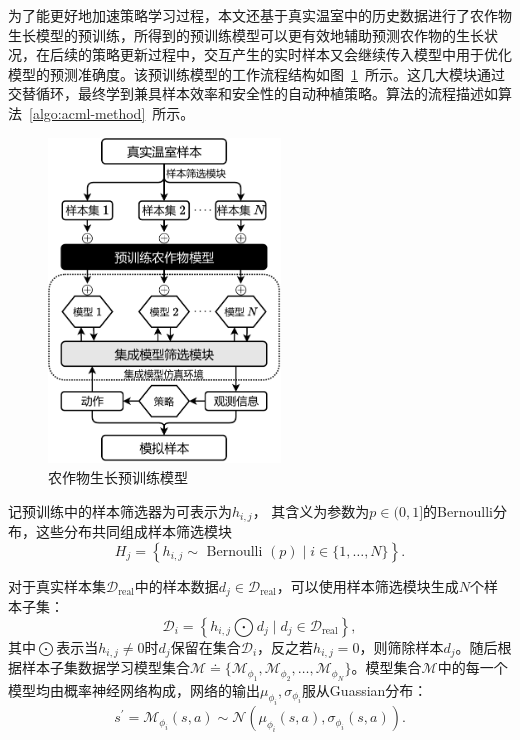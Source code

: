 为了能更好地加速策略学习过程，本文还基于真实温室中的历史数据进行了农作物生长模型的预训练，所得到的预训练模型可以更有效地辅助预测农作物的生长状况，在后续的策略更新过程中，交互产生的实时样本又会继续传入模型中用于优化模型的预测准确度。该预训练模型的工作流程结构如图~\ref{fig:pre-train-model}~所示。这几大模块通过交替循环，最终学到兼具样本效率和安全性的自动种植策略。算法的流程描述如算法~\ref{algo:acml-method}~所示。

\begin{figure}[ht]
\centering
\includegraphics[width=0.55\textwidth]{figures/pre-train-model.pdf}
\caption{农作物生长预训练模型}
\label{fig:pre-train-model}
\end{figure}

记预训练中的样本筛选器为可表示为$h_{i,j}$， 其含义为参数为$p\in(0, 1]$的Bernoulli分布，这些分布共同组成样本筛选模块
\begin{equation}
    H_{j}=\left\{h_{i,j} \sim \text { Bernoulli }(p) \mid i \in\{1, \ldots, N\}\right\}.
\end{equation}

对于真实样本集$\mathcal{D}_{\text{real}}$中的样本数据$d_j\in\mathcal{D}_{\text{real}}$，可以使用样本筛选模块生成$N$个样本子集：
\begin{equation}
    \mathcal{D}_i=\left\{h_{i,j}\bigodot d_j\mid d_j\in\mathcal{D}_{\text{real}}\right\},
\end{equation}
其中$\bigodot$表示当$h_{i,j}\neq 0$时$d_j$保留在集合$\mathcal{D}_i$，反之若$h_{i,j}=0$，则筛除样本$d_j$。随后根据样本子集数据学习模型集合$\mathcal{M} \doteq \{\mathcal{M}_{\phi_1},\mathcal{M}_{\phi_2},\ldots,\mathcal{M}_{\phi_N}\}$。模型集合$\mathcal{M}$中的每一个模型均由概率神经网络构成，网络的输出$\mu_{\phi_i},\sigma_{\phi_i}$服从Guassian分布：
\begin{equation}
    s^\prime = \mathcal{M}_{\phi_i}(s,a) \sim \mathcal{N}(\mu_{\phi_i}(s,a),\sigma_{\phi_i}(s,a)).
\end{equation}

